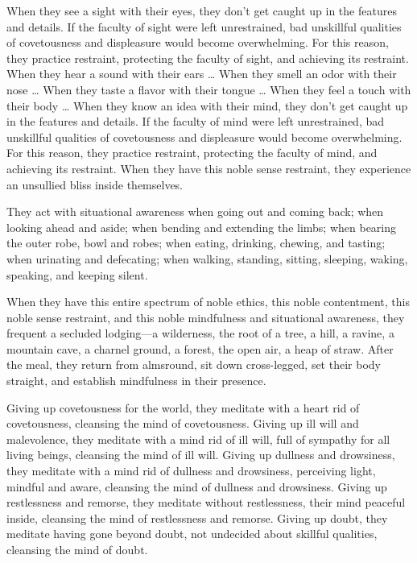 \documentclass[12pt,openany]{book}%
\begin{document}
When they see a sight with their eyes, they don’t get caught up in the features and details. If the faculty of sight were left unrestrained, bad unskillful qualities of covetousness and displeasure would become overwhelming. For this reason, they practice restraint, protecting the faculty of sight, and achieving its restraint. When they hear a sound with their ears … When they smell an odor with their nose … When they taste a flavor with their tongue … When they feel a touch with their body … When they know an idea with their mind, they don’t get caught up in the features and details. If the faculty of mind were left unrestrained, bad unskillful qualities of covetousness and displeasure would become overwhelming. For this reason, they practice restraint, protecting the faculty of mind, and achieving its restraint. When they have this noble sense restraint, they experience an unsullied bliss inside themselves. 

They act with situational awareness when going out and coming back; when looking ahead and aside; when bending and extending the limbs; when bearing the outer robe, bowl and robes; when eating, drinking, chewing, and tasting; when urinating and defecating; when walking, standing, sitting, sleeping, waking, speaking, and keeping silent. 

When they have this entire spectrum of noble ethics, this noble contentment, this noble sense restraint, and this noble mindfulness and situational awareness, they frequent a secluded lodging—a wilderness, the root of a tree, a hill, a ravine, a mountain cave, a charnel ground, a forest, the open air, a heap of straw. After the meal, they return from almsround, sit down cross-legged, set their body straight, and establish mindfulness in their presence. 

Giving up covetousness for the world, they meditate with a heart rid of covetousness, cleansing the mind of covetousness. Giving up ill will and malevolence, they meditate with a mind rid of ill will, full of sympathy for all living beings, cleansing the mind of ill will. Giving up dullness and drowsiness, they meditate with a mind rid of dullness and drowsiness, perceiving light, mindful and aware, cleansing the mind of dullness and drowsiness. Giving up restlessness and remorse, they meditate without restlessness, their mind peaceful inside, cleansing the mind of restlessness and remorse. Giving up doubt, they meditate having gone beyond doubt, not undecided about skillful qualities, cleansing the mind of doubt. 
\end{document}
